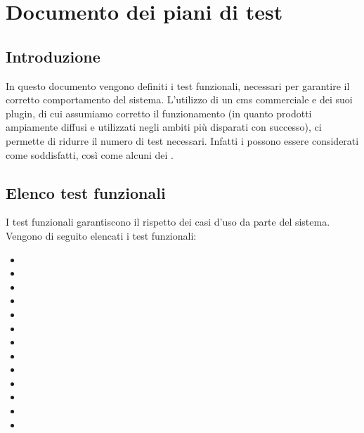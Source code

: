 \chapter{Documento dei piani di test}
\section{Introduzione}
In questo documento vengono definiti i test funzionali, necessari per garantire il corretto comportamento del sistema.
L'utilizzo di un \gls{cms} commerciale e dei suoi plugin, di cui assumiamo corretto il funzionamento (in quanto prodotti ampiamente diffusi e utilizzati negli ambiti più disparati con successo), ci permette di ridurre il numero di test necessari.
Infatti i  possono essere considerati come soddisfatti, così come alcuni dei .

\section{Elenco test funzionali}
I test funzionali garantiscono il rispetto dei casi d'uso da parte del sistema.
Vengono di seguito elencati i test funzionali:
\begin{itemize}
	\item {}
	\item {}
	\item {}
	\item {}
	\item {}
	\item {}
	\item {}
	\item {}
	\item {}
	\item {}
	\item {}
	\item {}
	\item {}
\end{itemize}

